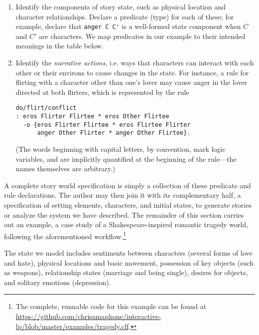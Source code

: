 \documentclass[letterpaper]{article}
\begin{document}
\begin{enumerate}
\item Identify the components of story state, such as physical location and
character relationships. Declare a predicate (type) for each of these; for
example, declare that \verb|anger C C'| is a well-formed state component
when $C$ and $C'$ are characters. We map predicates
in our example to their intended meanings in the table below.

\item Identify the {\em narrative actions}, i.e. ways that characters can
interact with each other or their environs to cause changes in the state.
For instance, a rule for flirting with a character other than one's lover
may cause anger in the lover directed at both flirters, which is
represented by the rule
\begin{verbatim}
do/flirt/conflict 
: eros Flirter Flirtee * eros Other Flirtee
  -o {eros Flirter Flirtee * eros Flirtee Flirter
      anger Other Flirter * anger Other Flirtee}.
\end{verbatim}
(The words beginning with capital letters, by convention, mark logic
variables, and are implicitly quantified at the beginning of the rule---the
names themselves are arbitrary.)
\end{enumerate}

A complete story world specification is simply a collection of these
predicate and rule declarations.  The author may then join it with its
complementary half, a specification of setting elements, characters, and
initial states, to generate stories or analyze the system we have
described.  The remainder of this section carries out an example, a case
study of a Shakespeare-inspired romantic tragedy world, following
the aforementioned workflow.\footnote{The complete, runnable code for this
example can be found at
\url{https://github.com/chrisamaphone/interactive-lp/blob/master/examples/tragedy.clf}.}

The state we model includes sentiments between characters (several forms of
love and hate), physical locations and basic movement, possession of key
objects (such as weapons), relationship states (marriage and being single),
desires for objects, and solitary emotions (depression).
\end{document}
